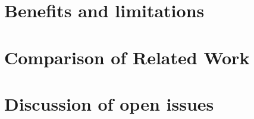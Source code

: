 

\section{Benefits and limitations}


\section{Comparison of Related Work}


\section{Discussion of open issues}